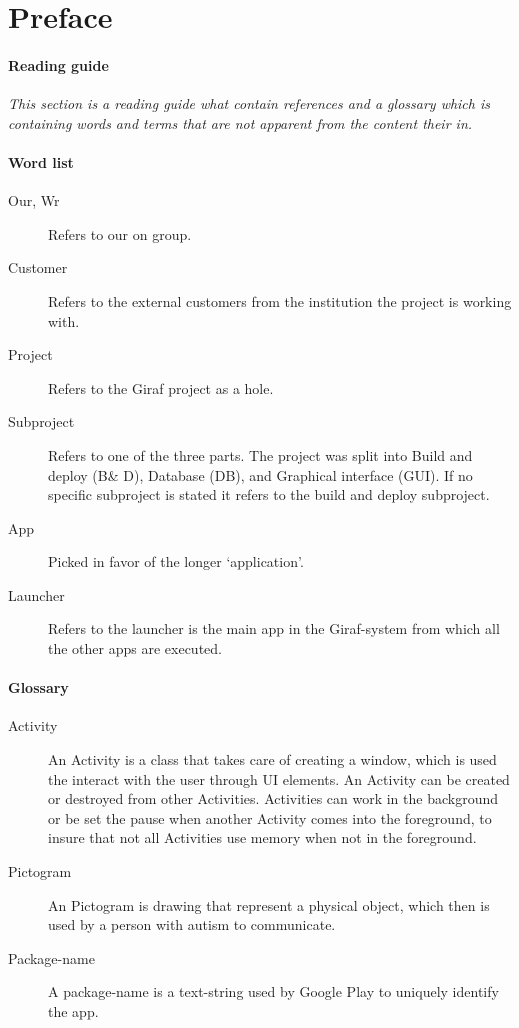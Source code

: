 \chapter*{Preface}

\subsubsection{Reading guide}
\textit{This section is a reading guide what contain references and a glossary which is containing words and terms that are not apparent from the content their in.}

\subsubsection{Word list}

\begin{description}
  \item[Our, Wr] Refers to our on group.
  
  \item[Customer] Refers to the external customers from the institution the project is working with.
  
  \item[Project] Refers to the Giraf project as a hole.
  
  \item[Subproject] Refers to one of the three parts. The project was split into Build and deploy (B\& D), Database (DB), and Graphical interface (GUI). If no specific subproject is stated it refers to the build and deploy subproject.
  
  \item[App] Picked in favor of the longer ‘application’.
  
  \item[Launcher] Refers to the launcher is the main app in the Giraf-system from which all the other apps are executed.
\end{description}

\subsubsection{Glossary}

\begin{description}
  \item[Activity] An Activity is a class that takes care of creating a window, which is used the interact with the user through UI elements. An Activity can be created or destroyed from other Activities. Activities can work in the background or be set the pause when another Activity comes into the foreground, to insure that not all Activities use memory when not in the foreground. 
  
  \item[Pictogram] An Pictogram is drawing that represent a physical object, which then is used by a person with autism to communicate. 
  
  \item[Package-name] A package-name is a text-string used by Google Play to uniquely identify the app.
  
\end{description}